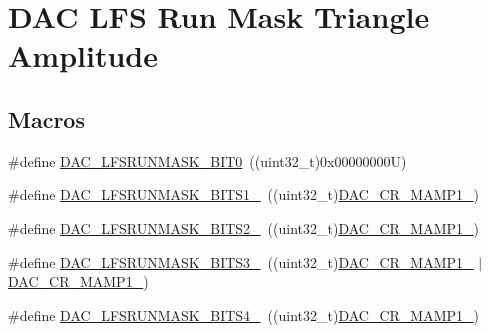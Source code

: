 \hypertarget{group___d_a_c_ex__lfsrunmask__triangleamplitude}{}\section{D\+AC L\+FS Run Mask Triangle Amplitude}
\label{group___d_a_c_ex__lfsrunmask__triangleamplitude}
\subsection*{Macros}
\begin{DoxyCompactItemize}
\item 
\#define \mbox{\hyperlink{group___d_a_c_ex__lfsrunmask__triangleamplitude_ga7a003ed3e05458a7d00a06c1ef16865b}{D\+A\+C\+\_\+\+L\+F\+S\+R\+U\+N\+M\+A\+S\+K\+\_\+\+B\+I\+T0}}~((uint32\+\_\+t)0x00000000\+U)
\item 
\#define \mbox{\hyperlink{group___d_a_c_ex__lfsrunmask__triangleamplitude_ga3a40c4b7ef3a0a98ddc5f7f577b2afb4}{D\+A\+C\+\_\+\+L\+F\+S\+R\+U\+N\+M\+A\+S\+K\+\_\+\+B\+I\+T\+S1\+\_}}~((uint32\+\_\+t)\mbox{\hyperlink{group___peripheral___registers___bits___definition_ga4225dcce22b440fcd3a8ad96c5f2baec}{D\+A\+C\+\_\+\+C\+R\+\_\+\+M\+A\+M\+P1\+\_}})
\item 
\#define \mbox{\hyperlink{group___d_a_c_ex__lfsrunmask__triangleamplitude_ga0f397695773c89e31930f9909a4668a6}{D\+A\+C\+\_\+\+L\+F\+S\+R\+U\+N\+M\+A\+S\+K\+\_\+\+B\+I\+T\+S2\+\_}}~((uint32\+\_\+t)\mbox{\hyperlink{group___peripheral___registers___bits___definition_ga6cc15817842cb7992d449c448684f68d}{D\+A\+C\+\_\+\+C\+R\+\_\+\+M\+A\+M\+P1\+\_}})
\item 
\#define \mbox{\hyperlink{group___d_a_c_ex__lfsrunmask__triangleamplitude_ga1a790464fa765ebd57b47385be54b136}{D\+A\+C\+\_\+\+L\+F\+S\+R\+U\+N\+M\+A\+S\+K\+\_\+\+B\+I\+T\+S3\+\_}}~((uint32\+\_\+t)\mbox{\hyperlink{group___peripheral___registers___bits___definition_ga6cc15817842cb7992d449c448684f68d}{D\+A\+C\+\_\+\+C\+R\+\_\+\+M\+A\+M\+P1\+\_}} $\vert$ \mbox{\hyperlink{group___peripheral___registers___bits___definition_ga4225dcce22b440fcd3a8ad96c5f2baec}{D\+A\+C\+\_\+\+C\+R\+\_\+\+M\+A\+M\+P1\+\_}})
\item 
\#define \mbox{\hyperlink{group___d_a_c_ex__lfsrunmask__triangleamplitude_ga15f06fc14c8931cecea96186edcc4cfc}{D\+A\+C\+\_\+\+L\+F\+S\+R\+U\+N\+M\+A\+S\+K\+\_\+\+B\+I\+T\+S4\+\_}}~((uint32\+\_\+t)\mbox{\hyperlink{group___peripheral___registers___bits___definition_ga0fefef1d798a2685b03e44bd9fdac06b}{D\+A\+C\+\_\+\+C\+R\+\_\+\+M\+A\+M\+P1\+\_}})

\end{DoxyCompactItemize}
